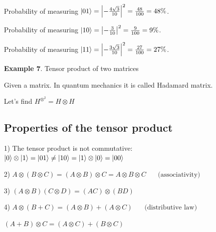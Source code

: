 \documentclass{article}
\begin{document}
Probability of measuring $\ket{01} = \left| -\frac{4\sqrt{3}}{10} \right|^2 = \frac{48}{100} = 48\% $.

Probability of measuring $\ket{10} = \left| -\frac{3}{10} \right|^2 = \frac{9}{100} = 9\% $.

Probability of measuring $\ket{11} = \left| -\frac{3\sqrt{3}}{10} \right|^2 = \frac{27}{100} = 27\% $.






\textbf{Example 7}. Tensor product of two matrices

Given a matrix.
In quantum mechanics it is called Hadamard matrix.

Let's find $H^{\otimes^{2}} = H \otimes H$



\subsection{Properties of the tensor product}

1) The tensor product is not commutative: $\ket{0} \otimes \ket{1} = \ket{01} \neq \ket{10} = \ket{1} \otimes \ket{0} = \ket{00} $

2) $ A \otimes (B \otimes C) = (A \otimes B) \otimes C 
= A \otimes B \otimes C	  \;\;\;\;\; 	\text{ (associativity) } $

3) $ (A \otimes B)(C \otimes D) = (AC)\otimes(BD) $

4) $ A \otimes (B + C) = (A \otimes B) + (A \otimes C) \;\;\;\;\; 	\text{ (distributive law) }$

$ (A + B) \otimes C = (A \otimes C) + (B \otimes C)$
\end{document}
